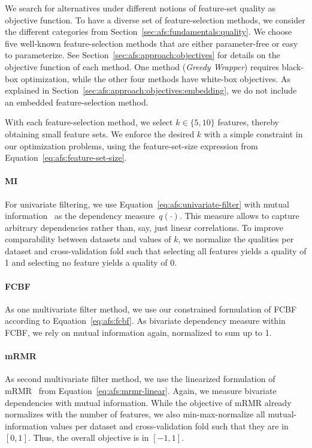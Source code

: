 \documentclass{article}
\theoremstyle{definition}
\begin{document}
We search for alternatives under different notions of feature-set quality as objective function.
To have a diverse set of feature-selection methods, we consider the different categories from Section~\ref{sec:afs:fundamentals:quality}.
We choose five well-known feature-selection methods that are either parameter-free or easy to parameterize.
See Section~\ref{sec:afs:approach:objectives} for details on the objective function of each method.
One method (\emph{Greedy Wrapper}) requires black-box optimization, while the other four methods have white-box objectives.
As explained in Section~\ref{sec:afs:approach:objectives:embedding}, we do not include an embedded feature-selection method.

With each feature-selection method, we select $k \in \{5,10\}$ features, thereby obtaining small feature sets.
We enforce the desired $k$ with a simple constraint in our optimization problems, using the feature-set-size expression from Equation~\ref{eq:afs:feature-set-size}.

\paragraph{MI}

For univariate filtering, we use Equation~\ref{eq:afs:univariate-filter} with mutual information~\cite{kraskov2004estimating} as the dependency measure~$q(\cdot)$.
This measure allows to capture arbitrary dependencies rather than, say, just linear correlations.
To improve comparability between datasets and values of $k$, we normalize the qualities per dataset and cross-validation fold such that selecting all features yields a quality of 1 and selecting no feature yields a quality of 0.

\paragraph{FCBF}

As one multivariate filter method, we use our constrained formulation of FCBF~\cite{yu2003feature} according to Equation~\ref{eq:afs:fcbf}.
As bivariate dependency measure within FCBF, we rely on mutual information again, normalized to sum up to 1.

\paragraph{mRMR}

As second multivariate filter method, we use the linearized formulation of mRMR~\cite{peng2005feature} from Equation~\ref{eq:afs:mrmr-linear}.
Again, we measure bivariate dependencies with mutual information.
While the objective of mRMR already normalizes with the number of features, we also min-max-normalize all mutual-information values per dataset and cross-validation fold such that they are in $[0,1]$.
Thus, the overall objective is in $[-1,1]$.
\end{document}
